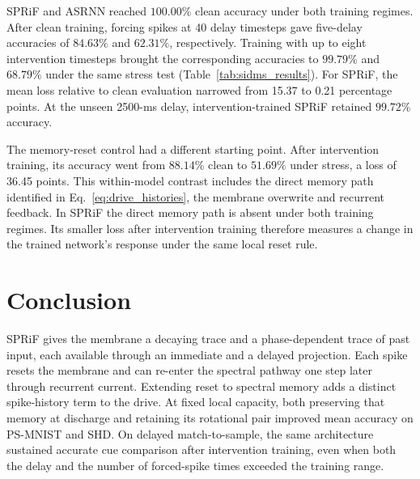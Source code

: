 \documentclass[letterpaper,journal]{IEEEtran}
\begin{document}
SPRiF and ASRNN reached $100.00\%$ clean accuracy under both training regimes. After clean training, forcing spikes at 40 delay timesteps gave five-delay accuracies of $84.63\%$ and $62.31\%$, respectively. Training with up to eight intervention timesteps brought the corresponding accuracies to $99.79\%$ and $68.79\%$ under the same stress test (Table~\ref{tab:sidms_results}). For SPRiF, the mean loss relative to clean evaluation narrowed from 15.37 to 0.21 percentage points. At the unseen 2500-ms delay, intervention-trained SPRiF retained $99.72\%$ accuracy.

The memory-reset control had a different starting point. After intervention training, its accuracy went from $88.14\%$ clean to $51.69\%$ under stress, a loss of 36.45 points. This within-model contrast includes the direct memory path identified in Eq.~\eqref{eq:drive_histories}, the membrane overwrite and recurrent feedback. In SPRiF the direct memory path is absent under both training regimes. Its smaller loss after intervention training therefore measures a change in the trained network's response under the same local reset rule.

\section{Conclusion}
\label{sec:conclusion}

SPRiF gives the membrane a decaying trace and a phase-dependent trace of past input, each available through an immediate and a delayed projection. Each spike resets the membrane and can re-enter the spectral pathway one step later through recurrent current. Extending reset to spectral memory adds a distinct spike-history term to the drive. At fixed local capacity, both preserving that memory at discharge and retaining its rotational pair improved mean accuracy on PS-MNIST and SHD. On delayed match-to-sample, the same architecture sustained accurate cue comparison after intervention training, even when both the delay and the number of forced-spike times exceeded the training range.
\end{document}
